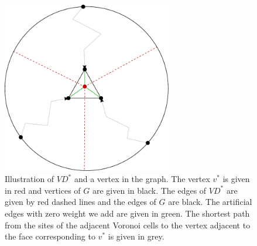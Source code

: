 \begin{figure}[h!]
  \centering
  \includegraphics[width=0.66\textwidth]{figs/vd2.pdf}
  \caption{Illustration of $VD^*$ and a vertex in the graph. The vertex $v^*$ is given in
  red and vertices of $G$ are given in black. The edges of $VD^*$ are given by red dashed
  lines and the edges
of $G$ are black. The artificial edges with zero weight we add are given in green. The
shortest path from the sites of the adjacent Voronoi cells to the vertex adjacent to the
face corresponding to $v^*$ is given in grey.}
    \label{vd2}
\end{figure}

